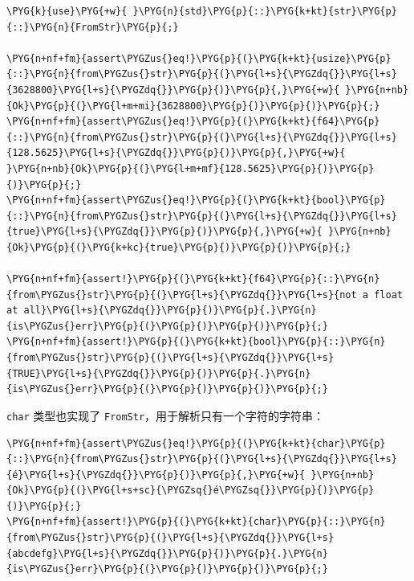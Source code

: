 \begin{Verbatim}[commandchars=\\\{\},breaklines=true,breakanywhere=true,fontsize=\codefont,xleftmargin=17bp]
\PYG{k}{use}\PYG{+w}{ }\PYG{n}{std}\PYG{p}{::}\PYG{k+kt}{str}\PYG{p}{::}\PYG{n}{FromStr}\PYG{p}{;}

\PYG{n+nf+fm}{assert\PYGZus{}eq!}\PYG{p}{(}\PYG{k+kt}{usize}\PYG{p}{::}\PYG{n}{from\PYGZus{}str}\PYG{p}{(}\PYG{l+s}{\PYGZdq{}}\PYG{l+s}{3628800}\PYG{l+s}{\PYGZdq{}}\PYG{p}{)}\PYG{p}{,}\PYG{+w}{ }\PYG{n+nb}{Ok}\PYG{p}{(}\PYG{l+m+mi}{3628800}\PYG{p}{)}\PYG{p}{)}\PYG{p}{;}
\PYG{n+nf+fm}{assert\PYGZus{}eq!}\PYG{p}{(}\PYG{k+kt}{f64}\PYG{p}{::}\PYG{n}{from\PYGZus{}str}\PYG{p}{(}\PYG{l+s}{\PYGZdq{}}\PYG{l+s}{128.5625}\PYG{l+s}{\PYGZdq{}}\PYG{p}{)}\PYG{p}{,}\PYG{+w}{ }\PYG{n+nb}{Ok}\PYG{p}{(}\PYG{l+m+mf}{128.5625}\PYG{p}{)}\PYG{p}{)}\PYG{p}{;}
\PYG{n+nf+fm}{assert\PYGZus{}eq!}\PYG{p}{(}\PYG{k+kt}{bool}\PYG{p}{::}\PYG{n}{from\PYGZus{}str}\PYG{p}{(}\PYG{l+s}{\PYGZdq{}}\PYG{l+s}{true}\PYG{l+s}{\PYGZdq{}}\PYG{p}{)}\PYG{p}{,}\PYG{+w}{ }\PYG{n+nb}{Ok}\PYG{p}{(}\PYG{k+kc}{true}\PYG{p}{)}\PYG{p}{)}\PYG{p}{;}

\PYG{n+nf+fm}{assert!}\PYG{p}{(}\PYG{k+kt}{f64}\PYG{p}{::}\PYG{n}{from\PYGZus{}str}\PYG{p}{(}\PYG{l+s}{\PYGZdq{}}\PYG{l+s}{not a float at all}\PYG{l+s}{\PYGZdq{}}\PYG{p}{)}\PYG{p}{.}\PYG{n}{is\PYGZus{}err}\PYG{p}{(}\PYG{p}{)}\PYG{p}{)}\PYG{p}{;}
\PYG{n+nf+fm}{assert!}\PYG{p}{(}\PYG{k+kt}{bool}\PYG{p}{::}\PYG{n}{from\PYGZus{}str}\PYG{p}{(}\PYG{l+s}{\PYGZdq{}}\PYG{l+s}{TRUE}\PYG{l+s}{\PYGZdq{}}\PYG{p}{)}\PYG{p}{.}\PYG{n}{is\PYGZus{}err}\PYG{p}{(}\PYG{p}{)}\PYG{p}{)}\PYG{p}{;}
\end{Verbatim}

\texttt{char} 类型也实现了 \texttt{FromStr}，用于解析只有一个字符的字符串：

\begin{Verbatim}[commandchars=\\\{\},breaklines=true,breakanywhere=true,fontsize=\codefont,xleftmargin=17bp]
\PYG{n+nf+fm}{assert\PYGZus{}eq!}\PYG{p}{(}\PYG{k+kt}{char}\PYG{p}{::}\PYG{n}{from\PYGZus{}str}\PYG{p}{(}\PYG{l+s}{\PYGZdq{}}\PYG{l+s}{é}\PYG{l+s}{\PYGZdq{}}\PYG{p}{)}\PYG{p}{,}\PYG{+w}{ }\PYG{n+nb}{Ok}\PYG{p}{(}\PYG{l+s+sc}{\PYGZsq{}é\PYGZsq{}}\PYG{p}{)}\PYG{p}{)}\PYG{p}{;}
\PYG{n+nf+fm}{assert!}\PYG{p}{(}\PYG{k+kt}{char}\PYG{p}{::}\PYG{n}{from\PYGZus{}str}\PYG{p}{(}\PYG{l+s}{\PYGZdq{}}\PYG{l+s}{abcdefg}\PYG{l+s}{\PYGZdq{}}\PYG{p}{)}\PYG{p}{.}\PYG{n}{is\PYGZus{}err}\PYG{p}{(}\PYG{p}{)}\PYG{p}{)}\PYG{p}{;}
\end{Verbatim}

